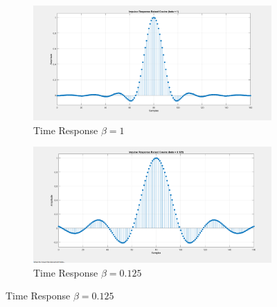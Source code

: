 \documentclass{article}
\begin{document}
\begin{figure}[h]
  \begin{center}

    \begin{subfigure}[b]{0.5\linewidth}
      \includegraphics[width=\linewidth]{img/impulse_response_beta_1.png}
      \caption{Time Response $\beta = 1$}
    \end{subfigure}

    \begin{subfigure}[b]{0.5\linewidth}
      \includegraphics[width=\linewidth]{img/impulse_response_beta_125.png}
      \caption{Time Response $\beta = 0.125$}
    \end{subfigure}

  \end{center}
\end{figure}
\end{document}

